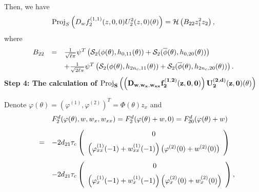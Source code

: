 \documentclass[11pt]{article}
\theoremstyle{definition}
\theoremstyle{remark}
\numberwithin{equation}{section}
\begin{document}
Then, we have
\begin{equation}
\label{PDWF221}
\textmd{Proj}_{S}\left(D_wf_2^{(1,1)}(z, 0,
0)U^2_2(z,0)(\theta)\right)=
\mathcal{H} \left(B_{22}z_1^2z_2\right),
 \end{equation}
where
\begin{equation}
\label{B22}
\begin{array}{lll}
B_{22} &=&\frac{1}{\sqrt{\ell\pi}}\psi ^T\left(\mathcal{S}_2(\phi(\theta) ,h_{0,11}(\theta))+\mathcal{S}_2(\overline{\phi} (\theta) ,h_{0,20}(\theta) ) \right) \vspace{0.2cm}\\
&&+\frac{1}{\sqrt{2\ell\pi}}\psi ^T\left(\mathcal{S}_2(\phi(\theta) ,h_{2n_c, 11}(\theta))+\mathcal{S}_2(\overline{\phi} (\theta) ,h_{2n_c, 20}(\theta) ) \right).
\end{array}
\end{equation}
\vspace{0.4cm}
\noindent
{\bf Step 4: The calculation of $\bf{ \mbox{Proj}_{S}\left(\left(D_{w,w_x,w_{xx}}f^{(1,2)}_2(z,0,0)\right)U_2^{(2,d)}(z, 0)(\theta)\right)}$}

Denote $\varphi(\theta)=\left(\varphi^{(1)},\varphi^{(2)}\right)^T=  \Phi(\theta) z_x$ and
$$
\begin{array}{lll}
&&F_2^d( \varphi(\theta),  w, w_x, w_{xx})=F_2^d( \varphi(\theta)+w,0)= F_{20}^d( \varphi(\theta)+w)  \vspace{0.3cm}\\
&=&
-2d_{21}\tau_c\left(\begin{array}{c}
0\vspace{0.2cm}\\
\left(\varphi^{(1)}_{xx}(-1)+w_{xx}^{(1)}(-1)\right)\left(\varphi^{(2)}(0)+w^{(2)}(0)\right)
\end{array}\right)
\vspace{0.3cm}\\
&&
-2d_{21}\tau_c\left(\begin{array}{c}
0\vspace{0.2cm}\\
\left(\varphi^{(1)}_x(-1)+w_{x}^{(1)}(-1)\right)\left(\varphi^{(2)}_{x}(0)+w_{x}^{(2)}(0)\right)
\end{array}\right),
\end{array}
$$
\end{document}
